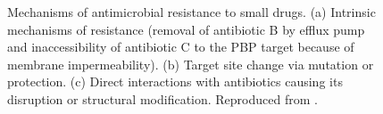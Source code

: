 \begin{figure}[h]
\begin{center}
\caption[Mechanisms of antimicrobial resistance to small drugs]{Mechanisms of antimicrobial resistance to small drugs. (a) Intrinsic mechanisms of resistance (removal of antibiotic B by efflux pump and inaccessibility of antibiotic C to the PBP target because of membrane impermeability). (b) Target site change via mutation or protection. (c) Direct interactions with antibiotics causing its disruption or structural modification. Reproduced from \cite{Blair2014}.} \label{fig:amr}
\end{center}
\end{figure}

